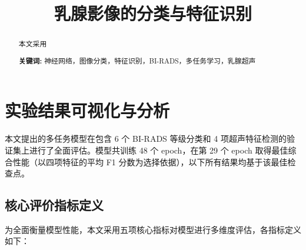 \documentclass[UTF8]{ctexart}
\title{乳腺影像的分类与特征识别}
\begin{document}
\maketitle
\setcounter{page}{0}
\maketitle
\thispagestyle{empty}

\begin{abstract}
本文采用
\par\textbf{关键词:} 神经网络，图像分类，特征识别，BI-RADS，多任务学习，乳腺超声
\end{abstract}



\section{实验结果可视化与分析}
本文提出的多任务模型在包含 6 个 BI-RADS 等级分类和 4 项超声特征检测的验证集上进行了全面评估。模型共训练 48 个 epoch，在第 29 个 epoch 取得最佳综合性能（以四项特征的平均 F1 分数为选择依据），以下所有结果均基于该最佳检查点。

\subsection{核心评价指标定义}

为全面衡量模型性能，本文采用五项核心指标对模型进行多维度评估，各指标定义如下：
\end{document}
